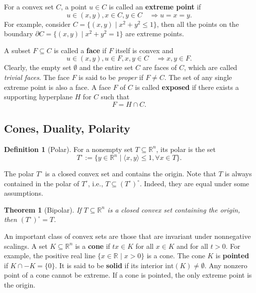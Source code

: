 \documentclass[
]{book}
\newtheorem{theorem}{Theorem}[chapter]
\theoremstyle{definition}
\newtheorem{definition}{Definition}[chapter]
\theoremstyle{definition}
\theoremstyle{definition}
\theoremstyle{definition}
\theoremstyle{remark}
\begin{document}
For a convex set \(C\), a point \(u \in C\) is called an \textbf{extreme point} if
\[
u \in (x,y), x \in C, y \in C \quad \Rightarrow u = x = y.
\]
For example, consider \(C = \{ (x,y)\mid x^2 + y^2 \leq 1 \}\), then all the points on the boundary \(\partial C = \{ (x,y) \mid x^2 + y^2 = 1 \}\) are extreme points.

A subset \(F \subseteq C\) is called a \textbf{face} if \(F\) itself is convex and
\[
u \in (x,y), u \in F, x,y \in C \quad \Rightarrow x,y \in F. 
\]
Clearly, the empty set \(\emptyset\) and the entire set \(C\) are faces of \(C\), which are called \emph{trivial faces}. The face \(F\) is said to be \emph{proper} if \(F \neq C\). The set of any single extreme point is also a face. A face \(F\) of \(C\) is called \textbf{exposed} if there exists a supporting hyperplane \(H\) for \(C\) such that
\[
F = H \cap C.
\]

\hypertarget{cones-duality-polarity}{%
\subsection{Cones, Duality, Polarity}\label{cones-duality-polarity}}

\begin{definition}[Polar]
\protect\hypertarget{def:polar}{}\label{def:polar}For a nonempty set \(T \subseteq \mathbb{R}^{n}\), its polar is the set
\begin{equation}
T^\circ := \{  y \in \mathbb{R}^{n} \mid \langle x, y \rangle \leq 1, \forall x \in T  \}.
\label{eq:polar}
\end{equation}
\end{definition}

The polar \(T^\circ\) is a closed convex set and contains the origin. Note that \(T\) is always contained in the polar of \(T^\circ\), i.e., \(T \subseteq (T^\circ)^\circ\). Indeed, they are equal under some assumptions.

\begin{theorem}[Bipolar]
\protect\hypertarget{thm:bipolar}{}\label{thm:bipolar}If \(T \subseteq \mathbb{R}^{n}\) is a closed convex set containing the origin, then \((T^\circ)^\circ = T\).
\end{theorem}

An important class of convex sets are those that are invariant under nonnegative scalings. A set \(K \subseteq \mathbb{R}^{n}\) is a \textbf{cone} if \(t x \in K\) for all \(x \in K\) and for all \(t > 0\). For example, the positive real line \(\{ x \in \mathbb{R}^{} \mid x > 0 \}\) is a cone. The cone \(K\) is \textbf{pointed} if \(K \cap -K = \{ 0 \}\). It is said to be \textbf{solid} if its interior \(\mathrm{int}(K) \neq \emptyset\). Any nonzero point of a cone cannot be extreme. If a cone is pointed, the only extreme point is the origin.
\end{document}
